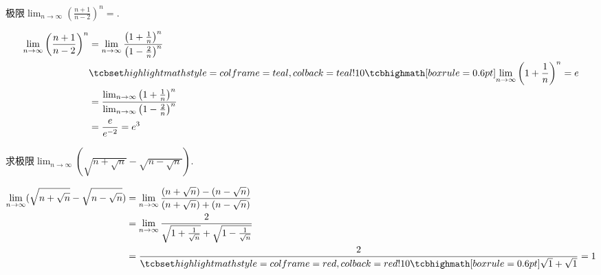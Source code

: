 \documentclass{ctexart}
\begin{document}
\mytoc
\tableofcontents
\clearpage

\begin{ques}[date=2020-8-20]
  极限$\lim_{n \to \infty} \left( \frac{n+1}{n-2} \right) ^n=$\blank.
\begin{solution}
  \begin{align*}
    \lim_{n \to \infty} \left( \frac{n+1}{n-2} \right) ^n
    &= \lim_{n \to \infty} \frac{\left( 1 + \frac{1}{n} \right) ^n}{\left( 1 -
    \frac{2}{n} \right) ^n}\\
    & \hint{\lim_{n \to \infty} \left( 1 + \frac{1}{n} \right) ^n = e}
    \\
    & = \frac{\lim_{n \to \infty} \left( 1 + \frac{1}{n} \right) ^n}{\lim_{n
    \to \infty} \left( 1 - \frac{2}{n} \right) ^n}\\
    & = \frac{e}{e^{-2}} = e^3
  \end{align*}
\end{solution}
\end{ques}

\begin{ques}[date=2020-8-20]
  求极限$\lim_{n \to \infty} (\sqrt{n + \sqrt{n}} - \sqrt{n - \sqrt{n}})$.
\begin{solution}
  \begin{align*}
    \lim_{n \to \infty} (\sqrt{n + \sqrt{n}} - \sqrt{n - \sqrt{n}})
    &= \lim_{n \to \infty} \frac{(n + \sqrt{n}) - (n - \sqrt{n})}{(n +
    \sqrt{n}) + (n - \sqrt{n})}\\
    &= \lim_{n \to \infty} \frac{2}{\sqrt{1 + \frac{1}{\sqrt{n}}} + \sqrt{1 -
    \frac{1}{\sqrt{n}}}}\\
    &= \frac{2}{\error{\sqrt{1} + \sqrt{1}}} = 1
  \end{align*}
\end{solution}
\end{ques}
\end{document}
